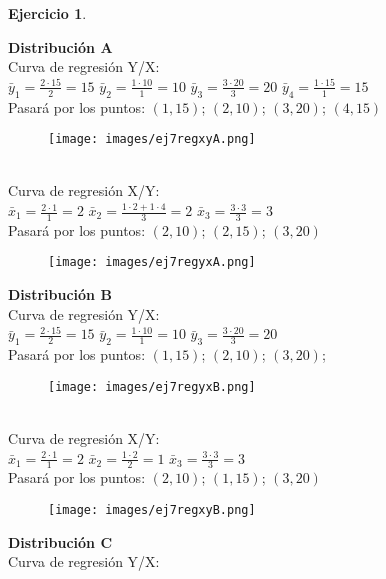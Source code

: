 \documentclass[a4paper, 12pt]{article}
\theoremstyle{definition}
\newtheorem{ej}{Ejercicio}
\begin{document}
\begin{ej}
\begin{enumerate}
        \textbf{Distribución A} \\
        Curva de regresión Y/X: \\
        $\bar{y}_1 = \frac{2 \cdot 15}{2} = 15$  $\bar{y}_2 = \frac{1 \cdot 10}{1} = 10$  $\bar{y}_3 = \frac{3 \cdot 20}{3} = 20$  $\bar{y}_4 = \frac{1 \cdot 15}{1} = 15$ \\
        Pasará por los puntos: $(1,15)$; $(2,10)$; $(3,20)$; $(4,15)$
        \begin{figure} [h]
        	\centering
    	    \texttt{[image: images/ej7regxyA.png]}
        \end{figure} \\
        Curva de regresión X/Y: \\
        $\bar{x}_1 = \frac{2 \cdot 1}{1} = 2$  $\bar{x}_2 = \frac{1 \cdot 2 + 1 \cdot 4}{3} = 2$  $\bar{x}_3 = \frac{3 \cdot 3}{3} = 3$ \\ 
        Pasará por los puntos: $(2,10)$; $(2,15)$; $(3,20)$ \\
        \begin{figure}[h]
        	\centering
    	    \texttt{[image: images/ej7regyxA.png]}
        \end{figure} 
        \newpage
        \textbf{Distribución B} \\
        Curva de regresión Y/X: \\
        $\bar{y}_1 = \frac{2 \cdot 15}{2} = 15$  $\bar{y}_2 = \frac{1 \cdot 10}{1} = 10$  $\bar{y}_3 = \frac{3 \cdot 20}{3} = 20$  \\
        Pasará por los puntos: $(1,15)$; $(2,10)$; $(3,20)$; \\
        \begin{figure}[h]
        	\centering
    	    \texttt{[image: images/ej7regyxB.png]}
        \end{figure} \\
        Curva de regresión X/Y: \\
        $\bar{x}_1 = \frac{2 \cdot 1}{1} = 2$  $\bar{x}_2 = \frac{1 \cdot 2}{2} = 1$  $\bar{x}_3 = \frac{3 \cdot 3}{3} = 3$ \\ 
        Pasará por los puntos: $(2,10)$; $(1,15)$; $(3,20)$ \\
        \begin{figure}[h]
        	\centering
    	    \texttt{[image: images/ej7regxyB.png]}
        \end{figure}
        \newpage
        \textbf{Distribución C} \\
        Curva de regresión Y/X: \\

\end{enumerate}
\end{ej}
\end{document}
